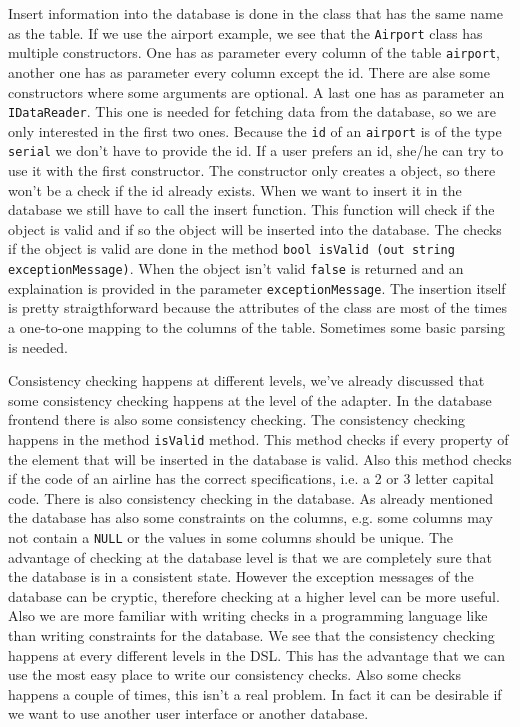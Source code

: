 Insert information into the database is done in the class that has the same name as the table. If we use the airport example, we see that the \texttt{Airport} class has multiple constructors. One has as parameter every column of the table \texttt{airport}, another one has as parameter every column except the id. There are alse some constructors where some arguments are optional.
A last one has as parameter an  \texttt{IDataReader}. This one is needed for fetching data from the database, so we are only interested in the first two ones. Because the \texttt{id} of an \texttt{airport} is of the type \texttt{serial} we don't have to provide the id. If a user prefers an id, she/he can try to use it with the first constructor. The constructor only creates a \Csh object, so there won't be a check if the id already exists. When we want to insert it in the database we still have to call the insert function. This function will check if the object is valid and if so the object will be inserted into the database. The checks if the object is valid are done in the method \texttt{bool isValid (out string exceptionMessage)}. When the object isn't valid \texttt{false} is returned and an explaination is provided in the parameter \texttt{exceptionMessage}. The insertion itself is pretty straigthforward because the attributes of the class are most of the times a one-to-one mapping to the columns of the table. Sometimes some basic parsing is needed.

Consistency checking happens at different levels, we've already discussed that some consistency checking happens at the level of the adapter. In the database frontend there is also some consistency checking. The consistency checking happens in the method \texttt{isValid} method. This method checks if every property of the element that will be inserted in the database is valid. Also this method checks if the code of an airline has the correct specifications, i.e. a 2 or 3 letter capital code. There is also consistency checking in the database. As already mentioned the database has also some constraints on the columns, e.g. some columns may not contain a \texttt{NULL} or the values in some columns should be unique. The advantage of checking at the database level is that we are completely sure that the database is in a consistent state. However the exception messages of the database can be cryptic, therefore checking at a higher level can be more useful. Also we are more familiar with writing checks in a programming language like \Csh than writing constraints for the database. We see that the consistency checking happens at every different levels in the DSL. This has the advantage that we can use the most easy place to write our consistency checks. Also some checks happens a couple of times, this isn't a real problem. In fact it can be desirable if we want to use another user interface or another database.